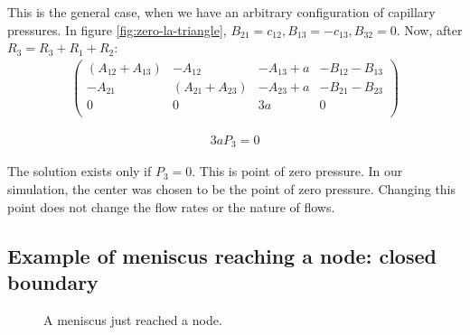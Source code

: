 \documentclass{crm-article}
\begin{document}
			This is the general case, when we have an arbitrary configuration of capillary pressures. In figure \ref{fig:zero-la-triangle}, $B_{21} = c_{12}, B_{13} = -c_{13}, B_{32} = 0$. Now, after $R_3 = R_3 + R_1 + R_2$:
			\begin{gather}
				\begin{pmatrix}
					(A_{12} + A_{13}) & -A_{12} & -A_{13} + a & -B_{12} - B_{13} \\
					-A_{21} & (A_{21} + A_{23}) & -A_{23} + a & -B_{21} - B_{23} \\
					0 & 0 & 3a & 0 \\
				\end{pmatrix}
			\end{gather}
			
			\begin{gather}
				3aP_3 = 0
			\end{gather}
			
			The solution exists only if $P_3 = 0$. This is point of zero pressure. In our simulation, the center was chosen to be the point of zero pressure. Changing this point does not change the flow rates or the nature of flows.

		\subsection{Example of meniscus reaching a node: closed boundary} \label{sec:example-meniscus-in-node}
		
			\begin{figure}[H]
				\centering
				\hfill
				\caption{A meniscus just reached a node.}
			\end{figure}
\end{document}

